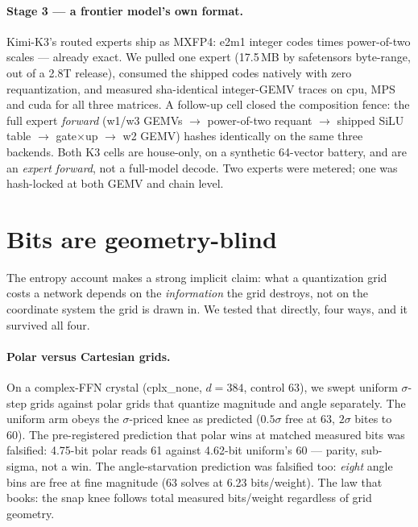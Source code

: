 \documentclass[11pt]{article}
\begin{document}
\paragraph{Stage 3 --- a frontier model's own format.}
Kimi-K3's routed experts ship as MXFP4: e2m1 integer codes times power-of-two
scales --- already exact. We pulled one expert (17.5\,MB by safetensors
byte-range, out of a 2.8T release), consumed the shipped codes natively with zero
requantization, and measured sha-identical integer-GEMV traces on cpu, MPS and
cuda for all three matrices. %
A follow-up cell closed the composition fence: the full expert \emph{forward}
(w1/w3 GEMVs $\to$ power-of-two requant $\to$ shipped SiLU table $\to$ gate$\times$up
$\to$ w2 GEMV) hashes identically on the same three backends.
Both K3 cells are house-only, on a synthetic 64-vector battery, and are an
\emph{expert forward}, not a full-model decode. %
Two experts were metered; one was hash-locked at both GEMV and chain level.

\section{Bits are geometry-blind}
\label{sec:geometry}

The entropy account makes a strong implicit claim: what a quantization grid costs
a network depends on the \emph{information} the grid destroys, not on the
coordinate system the grid is drawn in. We tested that directly, four ways, and
it survived all four.

\paragraph{Polar versus Cartesian grids.}
On a complex-FFN crystal (cplx\_none, $d{=}384$, control 63), we swept uniform
$\sigma$-step grids against polar grids that quantize magnitude and angle
separately. The uniform arm obeys the $\sigma$-priced knee as predicted
($0.5\sigma$ free at 63, $2\sigma$ bites to 60). The pre-registered prediction
that polar wins at matched measured bits was falsified: 4.75-bit polar reads 61
against 4.62-bit uniform's 60 --- parity, sub-sigma, not a win.
The angle-starvation prediction was falsified too: \emph{eight} angle bins are
free at fine magnitude (63 solves at 6.23 bits/weight). %
The law that books: the snap knee follows total measured bits/weight regardless
of grid geometry. %
\end{document}
